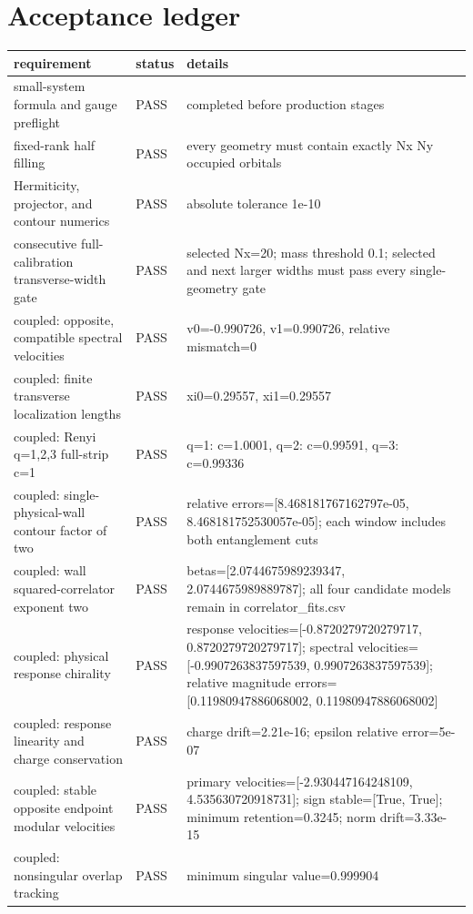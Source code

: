 \documentclass[aps,prb,onecolumn,nofootinbib,superscriptaddress]{revtex4-2}
\begin{document}
\section{Acceptance ledger}
\begin{longtable}{p{}p{}p{}}
\toprule
requirement & status & details \\
\midrule
small-system formula and gauge preflight & PASS & completed before production stages \\
fixed-rank half filling & PASS & every geometry must contain exactly Nx Ny occupied orbitals \\
Hermiticity, projector, and contour numerics & PASS & absolute tolerance 1e-10 \\
consecutive full-calibration transverse-width gate & PASS & selected Nx=20; mass threshold 0.1; selected and next larger widths must pass every single-geometry gate \\
coupled: opposite, compatible spectral velocities & PASS & v0=-0.990726, v1=0.990726, relative mismatch=0 \\
coupled: finite transverse localization lengths & PASS & xi0=0.29557, xi1=0.29557 \\
coupled: Renyi q=1,2,3 full-strip c=1 & PASS & q=1: c=1.0001, q=2: c=0.99591, q=3: c=0.99336 \\
coupled: single-physical-wall contour factor of two & PASS & relative errors=[8.468181767162797e-05, 8.468181752530057e-05]; each window includes both entanglement cuts \\
coupled: wall squared-correlator exponent two & PASS & betas=[2.0744675989239347, 2.0744675989889787]; all four candidate models remain in correlator\_fits.csv \\
coupled: physical response chirality & PASS & response velocities=[-0.8720279720279717, 0.8720279720279717]; spectral velocities=[-0.9907263837597539, 0.9907263837597539]; relative magnitude errors=[0.11980947886068002, 0.11980947886068002] \\
coupled: response linearity and charge conservation & PASS & charge drift=2.21e-16; epsilon relative error=5e-07 \\
coupled: stable opposite endpoint modular velocities & PASS & primary velocities=[-2.930447164248109, 4.535630720918731]; sign stable=[True, True]; minimum retention=0.3245; norm drift=3.33e-15 \\
coupled: nonsingular overlap tracking & PASS & minimum singular value=0.999904 \\

\end{longtable}
\end{document}
